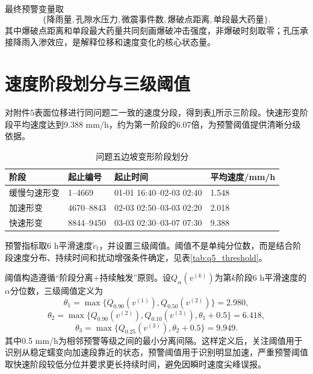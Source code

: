 最终预警变量取
\[
  \{\text{降雨量},\text{孔隙水压力},\text{微震事件数},\text{爆破点距离},\text{单段最大药量}\}.
\]
其中爆破点距离和单段最大药量共同刻画爆破冲击强度，非爆破时刻取零；孔压承接降雨入渗效应，是解释位移和速度变化的核心状态量。

\section{速度阶段划分与三级阈值}

对附件5表面位移进行同问题二一致的速度分段，得到表\ref{tab:q5_stage}所示三阶段。快速形变阶段平均速度达到9.388 mm/h，约为第一阶段的6.07倍，为预警阈值提供清晰分级依据。

\begin{table}[htbp]
\centering
\small
\caption{问题五边坡变形阶段划分}
\label{tab:q5_stage}
\begin{tabular}{llll}
\toprule
阶段 & 起止编号 & 起止时间 & 平均速度/mm/h \\
\midrule
缓慢匀速形变 & 1--4669 & 01-01 16:40--02-03 02:40 & 1.548 \\
加速形变 & 4670--8843 & 02-03 02:50--03-03 02:20 & 2.018 \\
快速形变 & 8844--9450 & 03-03 02:30--03-07 07:30 & 9.388 \\
\bottomrule
\end{tabular}
\end{table}

预警指标取6 h平滑速度$\tilde v_t$，并设置三级阈值。阈值不是单纯分位数，而是结合阶段速度分布、持续时间和扰动增强条件确定，见表\ref{tab:q5_threshold}。

阈值构造遵循“阶段分离+持续触发”原则。设$Q_\alpha(v^{(k)})$为第$k$阶段6 h平滑速度的$\alpha$分位数，三级阈值定义为
\begin{equation}
  \theta_1=\max\{Q_{0.90}(v^{(1)}),Q_{0.50}(v^{(2)})\}=2.980,
\end{equation}
\begin{equation}
  \theta_2=\max\{Q_{0.90}(v^{(2)}),Q_{0.10}(v^{(3)}),\theta_1+0.5\}=6.418,
\end{equation}
\begin{equation}
  \theta_3=\max\{Q_{0.25}(v^{(3)}),\theta_2+0.5\}=9.949.
\end{equation}
其中0.5 mm/h为相邻预警等级之间的最小分离间隔。这样定义后，关注阈值用于识别从稳定蠕变向加速段靠近的状态，预警阈值用于识别明显加速，严重预警阈值取快速阶段较低分位并要求更长持续时间，避免因瞬时速度尖峰误报。

